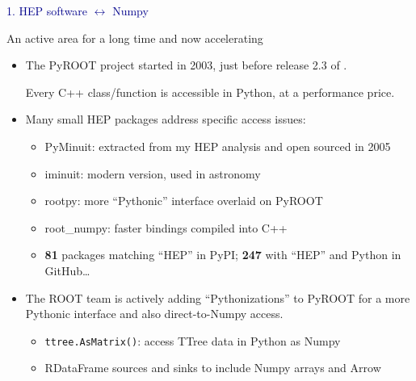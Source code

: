 \documentclass[aspectratio=169]{beamer}
\begin{document}
\begin{frame}{}
\LARGE
\vspace{1 cm}
\begin{center}
\textcolor{darkblue}{1. HEP software $\leftrightarrow$ Numpy}
\end{center}
\end{frame}

\begin{frame}{An active area for a long time and now accelerating}
\vspace{0.5 cm}
\begin{itemize}\setlength{\itemsep}{0.5 cm}
\item The PyROOT project started in 2003, just before release 2.3 of .

Every C++ class/function is accessible in Python, at a performance price.

\item Many small HEP packages address specific access issues:

\vspace{0.05 cm}
\begin{itemize}\setlength{\itemsep}{0.05 cm}
\item PyMinuit: extracted from my HEP analysis and open sourced in 2005
\item iminuit: modern version, used in astronomy
\item rootpy: more ``Pythonic'' interface overlaid on PyROOT
\item root\_numpy: faster bindings compiled into C++
\item {\bf 81} packages matching ``HEP'' in PyPI; {\bf 247} with ``HEP'' and Python in GitHub\ldots
\end{itemize}

\item The ROOT team is actively adding ``Pythonizations'' to PyROOT for a more Pythonic interface and also direct-to-Numpy access.

\vspace{0.1 cm}
\begin{itemize}\setlength{\itemsep}{0.1 cm}
\item {\tt\small ttree.AsMatrix()}: access TTree data in Python as Numpy
\item RDataFrame sources and sinks to include Numpy arrays and Arrow
\end{itemize}
\end{itemize}
\end{frame}
\end{document}
